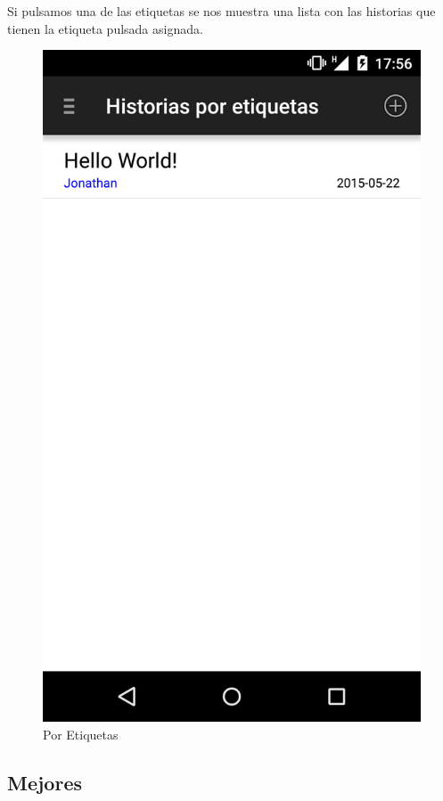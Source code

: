 \documentclass[11pt,a4paper, titlepage]{article}
\begin{document}
	Si pulsamos una de las etiquetas se nos muestra una lista con las historias que tienen la etiqueta pulsada asignada.
	
	\begin{figure}[!h]
		\centering
		\includegraphics[scale = 0.18 ]{img/7}
		\caption{Por Etiquetas}
		\label{p15}
	\end{figure}
	
	\FloatBarrier
	\subsection[Mejores]{Mejores}
	
\end{document}
